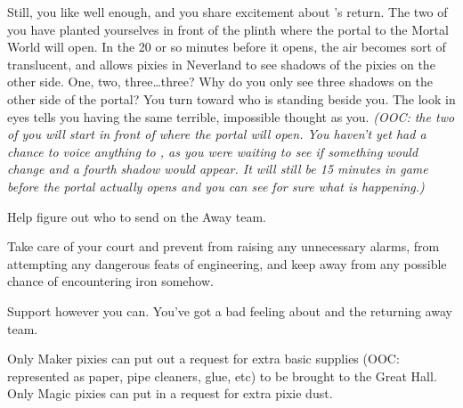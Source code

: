 \documentclass[char]{PP}
\begin{document}
Still, you like \cFButterfly{} well enough, and you share \cFButterfly{\their} excitement about \cFLost{}’s return. The two of you have planted yourselves in front of the plinth where the portal to the Mortal World will open. In the 20 or so minutes before it opens, the air becomes sort of translucent, and allows pixies in Neverland to see shadows of the pixies on the other side. One, two, three\ldots three? Why do you only see three shadows on the other side of the portal?  You turn toward \cFButterfly{} who is standing beside you. The look in \cFButterfly{\their} eyes tells you \cFButterfly{\they} \cFButterfly{\are} having the same terrible, impossible thought as you. \textit{(OOC: the two of you will start in front of where the portal will open. You haven’t yet had a chance to voice anything to \cFButterfly{}, as you were waiting to see if something would change and a fourth shadow would appear. It will still be 15 minutes in game before the portal actually opens and you can see for sure what is happening.)}

\begin{itemz}
	\item Help \cSHead{} figure out who to send on the Away team.
	\item Take care of your court and prevent \cMTree{} from raising any unnecessary alarms, \cMAirship{} from attempting any dangerous feats of engineering, and keep \cMIron{} away from any possible chance of encountering iron somehow.
	\item Support \cFButterfly{} however you can. You’ve got a bad feeling about \cFLost{} and the returning away team.
\end{itemz}

\begin{itemz}[Notes]
	\item Only Maker pixies can put out a request for extra basic supplies (OOC: represented as paper, pipe cleaners, glue, etc) to be brought to the Great Hall. Only Magic pixies can put in a request for extra pixie dust.
\end{itemz}
\end{document}
